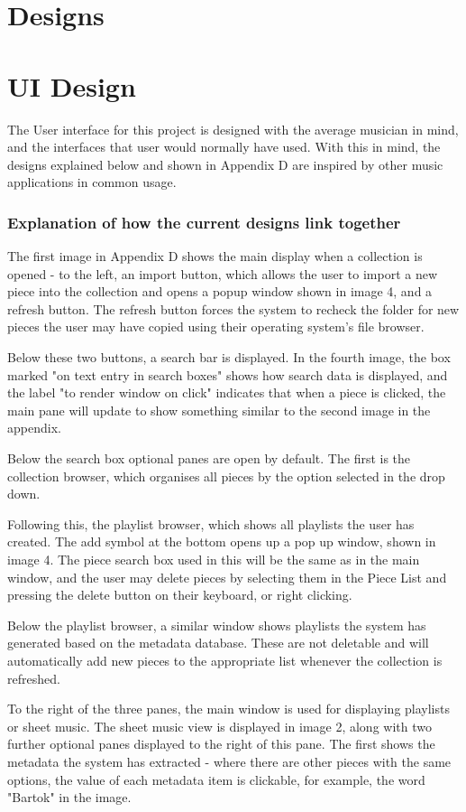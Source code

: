 \documentclass[bibtotocnumbered]{article}
\begin{document}
\section{Designs}
\section{UI Design}
The User interface for this project is designed with the average musician in mind, and the interfaces that user would normally have used. With this in mind, the designs explained below and shown in Appendix D are inspired by other music applications in common usage.

\subsubsection{Explanation of how the current designs link together}
The first image in Appendix D shows the main display when a collection is opened - to the left, an import button, which allows the user to import a new piece into the collection and opens a popup window shown in image 4, and a refresh button. The refresh button forces the system to recheck the folder for new pieces the user may have copied using their operating system's file browser.

Below these two buttons, a search bar is displayed. In the fourth image, the box marked "on text entry in search boxes" shows how search data is displayed, and the label "to render window on click" indicates that when a piece is clicked, the main pane will update to show something similar to the second image in the appendix.

Below the search box optional panes are open by default. The first is the collection browser, which organises all pieces by the option selected in the drop down. 

Following this, the playlist browser, which shows all playlists the user has created. The add symbol at the bottom opens up a pop up window, shown in image 4. The piece search box used in this will be the same as in the main window, and the user may delete pieces by selecting them in the Piece List and pressing the delete button on their keyboard, or right clicking.

Below the playlist browser, a similar window shows playlists the system has generated based on the metadata database. These are not deletable and will automatically add new pieces to the appropriate list whenever the collection is refreshed.

To the right of the three panes, the main window is used for displaying playlists or sheet music. The sheet music view is displayed in image 2, along with two further optional panes displayed to the right of this pane. The first shows the metadata the system has extracted - where there are other pieces with the same options, the value of each metadata item is clickable, for example, the word "Bartok" in the image. 
\end{document}
